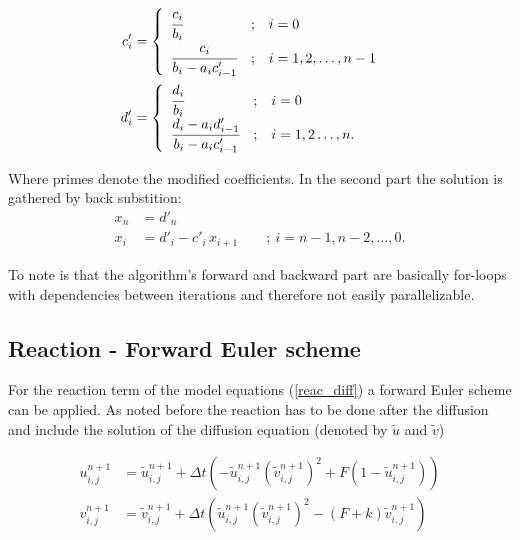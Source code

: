 \documentclass[11pt,a4paper]{article} %
\begin{document}
\begin{equation} \label{forward_modify}
\begin{aligned}
	c'_i &=
\begin{cases}
\begin{array}{lcl}
  \cfrac{c_i}{b_i}                  & ; & i = 0 \\
  \cfrac{c_i}{b_i - a_i c'_{i - 1}} & ; & i = 1, 2, \dots, n-1 \\
\end{array}
\end{cases} \\
d'_i &=
\begin{cases}
\begin{array}{lcl}
  \cfrac{d_i}{b_i}                  & ; & i = 0 \\
  \cfrac{d_i - a_i d'_{i - 1}}{b_i - a_i c'_{i - 1}} & ; & i = 1, 2 \dots, n. \\
\end{array}
\end{cases}
\end{aligned}
\end{equation}

Where primes denote the modified coefficients.
In the second part the solution is gathered by back substition:
\begin{equation} \label{back_subst}
\begin{aligned}
	x_n &= d'_n \\
	x_i &= d'_i - c'_i\, x_{i + 1} \qquad ; \ i = n - 1, n - 2, \ldots, 0.
\end{aligned}
\end{equation}

To note is that the algorithm's forward and backward part are basically for-loops with dependencies between iterations and therefore not easily parallelizable. 

\subsection{Reaction - Forward Euler scheme}

For the reaction term of the model equations (\ref{reac_diff}) a forward Euler scheme can be applied. As noted before the reaction has to be done after the diffusion and include the solution of the diffusion equation (denoted by $\tilde u $ and $ \tilde v$)

\begin{equation} \label{reaction}
\begin{aligned}
	u_{i,j}^{n+1} &= \tilde u_{i,j}^{n+1} + \Delta t \left( - \tilde u_{i,j}^{n+1} (\tilde v_{i,j}^{n+1})^2 + F ( 1- \tilde u_{i,j}^{n+1} ) \right) \\
	v_{i,j}^{n+1} &= \tilde v_{i,j}^{n+1} + \Delta t \left( \tilde u_{i,j}^{n+1} (\tilde v_{i,j}^{n+1})^2 - (F+k) \tilde v_{i,j}^{n+1} \right)
\end{aligned}
\end{equation}
\end{document}
